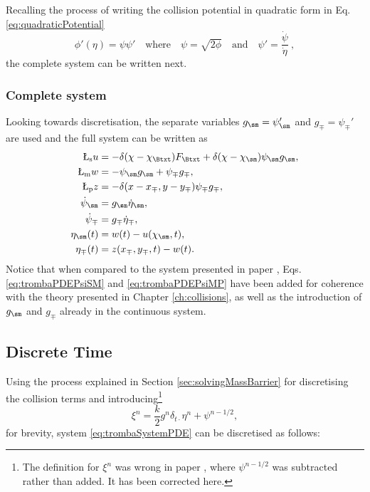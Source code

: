 Recalling the process of writing the collision potential in quadratic form in Eq. \eqref{eq:quadraticPotential}
\begin{equation}\label{eq:quadraticPotentialTromba}
    \phi'(\eta) = \psi\psi' \quad \text{where} \quad \psi = \sqrt{2\phi} \quad \text{and} \quad \psi' = \frac{\dot{\psi}}{\dot{\eta}}\ ,
\end{equation}
the complete system can be written next.

\subsubsection{Complete system}
Looking towards discretisation, the separate variables $g_\sm=\psi_\sm'$ and $g_\mp=\psi_\mp'$ are used and the full system can be written as 
\begin{subequations}\label{eq:trombaSystemPDE}
    \begin{align}
        \L_\text{s}u &= -\delta(\chi-\chi_\Btxt)F_\Btxt + \delta(\chi - \chi_\sm)\psi_\sm g_\sm,\\
        \L_\text{m}w &= - \psi_\sm g_\sm + \psi_\mp g_\mp,\\
        \L_\text{p}z &= -\delta(x-x_\mp, y-y_\mp)\psi_\mp g_\mp,\\
        \dot\psi_\sm &= g_\sm \dot \eta_\sm,\label{eq:trombaPDEPsiSM}\\
        \dot\psi_\mp &= g_\mp \dot \eta_\mp,\label{eq:trombaPDEPsiMP}\\
        \eta_\sm(t) &= w(t) - u(\chi_\sm, t),\\
        \eta_\mp(t) &= z(x_\mp, y_\mp, t) - w(t).
    \end{align}
\end{subequations}
Notice that when compared to the system presented in paper \citeP[D], Eqs. \eqref{eq:trombaPDEPsiSM} and \eqref{eq:trombaPDEPsiMP} have been added for coherence with the theory presented in Chapter \ref{ch:collisions}, as well as the introduction of $g_\sm$ and $g_\mp$ already in the continuous system.


\subsection{Discrete Time}
Using the process explained in Section \ref{sec:solvingMassBarrier} for discretising the collision terms and introducing\footnote{The definition for $\xi^n$ was wrong in paper \citeP[D], where $\psi^{n-1/2}$ was subtracted rather than added. It has been corrected here.} 
\begin{equation}
    \xi^n = \frac{k}{2}g^n\delta_{t\cdot}\eta^n + \psi^{n-1/2},
\end{equation}
for brevity, system \eqref{eq:trombaSystemPDE} can be discretised as follows:

